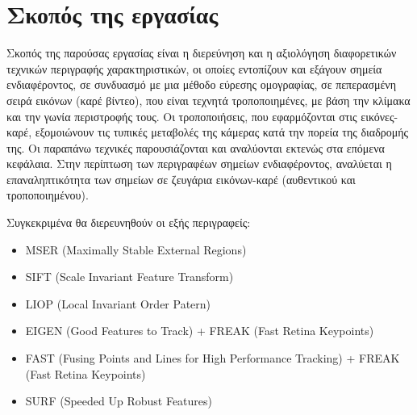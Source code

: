 \section{Σκοπός της εργασίας}

Σκοπός της παρούσας εργασίας είναι η διερεύνηση και η αξιολόγηση διαφορετικών τεχνικών περιγραφής χαρακτηριστικών, οι οποίες εντοπίζουν και εξάγουν σημεία ενδιαφέροντος,
σε συνδυασμό με μια μέθοδο εύρεσης ομογραφίας, σε πεπερασμένη σειρά εικόνων (καρέ βίντεο),
που είναι τεχνητά τροποποιημένες, με βάση την κλίμακα και την γωνία περιστροφής τους. 
Οι τροποποιήσεις, που εφαρμόζονται στις εικόνες-καρέ, εξομοιώνουν τις τυπικές μεταβολές της κάμερας κατά την πορεία της διαδρομής της.
Οι παραπάνω τεχνικές παρουσιάζονται και αναλύονται εκτενώς στα επόμενα κεφάλαια. Στην περίπτωση των περιγραφέων σημείων ενδιαφέροντος, 
αναλύεται η επαναληπτικότητα των σημείων σε ζευγάρια εικόνων-καρέ (αυθεντικού και τροποποιημένου).\par
Συγκεκριμένα θα διερευνηθούν οι εξής περιγραφείς:

\begin{itemize}
 \item MSER (Maximally Stable External Regions)
 \item SIFT (Scale Invariant Feature Transform)
 \item LIOP (Local Invariant Order Patern)
 \item EIGEN (Good Features to Track) + FREAK (Fast Retina Keypoints)
 \item FAST (Fusing Points and Lines for High Performance Tracking) + FREAK (Fast Retina Keypoints)
 \item SURF (Speeded Up Robust Features)
\end{itemize}


